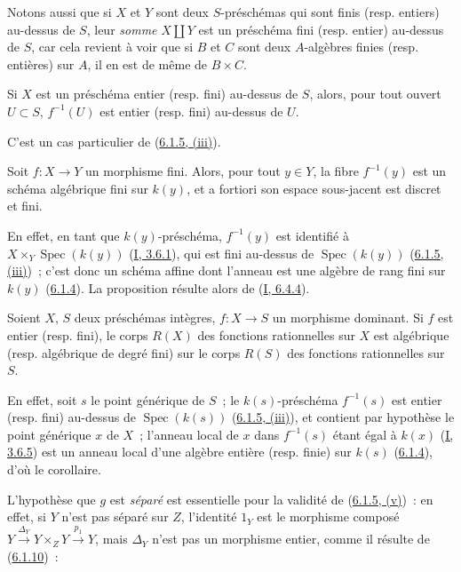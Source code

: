 Notons aussi que si $X$ et $Y$ sont deux $S$-préschémas qui sont finis (resp.
entiers) au-dessus de $S$, leur \emph{somme} $X\amalg Y$ est un préschéma fini
(resp. entier) au-dessus de $S$, car cela revient à voir que si $B$ et $C$
sont deux $A$-algèbres finies (resp. entières) sur $A$, il en est de même de
$B\times C$.

\begin{corollary}[6.1.6]
\label{II.6.1.6-fr}
Si $X$ est un préschéma entier (resp. fini) au-dessus de $S$, alors, pour tout
ouvert $U\subset S$, $f^{-1}(U)$ est entier (resp. fini) au-dessus de $U$.
\end{corollary}

C'est un cas particulier de (\hyperref[II.6.1.5-fr]{6.1.5, (iii)}).

\begin{corollary}[6.1.7]
\label{II.6.1.7-fr}
Soit $f:X\to Y$ un morphisme fini. Alors, pour tout $y\in Y$, la fibre
$f^{-1}(y)$ est un schéma algébrique fini sur $k(y)$, et a fortiori son
espace sous-jacent est discret et fini.
\end{corollary}

En effet, en tant que $k(y)$-préschéma, $f^{-1}(y)$ est identifié à
$X\times_Y\operatorname{Spec}(k(y))$ (\hyperref[I.3.6.1-fr]{I, 3.6.1}), qui
est fini au-dessus de $\operatorname{Spec}(k(y))$
(\hyperref[II.6.1.5-fr]{6.1.5, (iii)})~; c'est donc un schéma affine dont
l'anneau est une algèbre de rang fini sur $k(y)$
(\hyperref[II.6.1.4-fr]{6.1.4}). La proposition résulte alors de
(\hyperref[I.6.4.4-fr]{I, 6.4.4}).

\begin{corollary}[6.1.8]
\label{II.6.1.8-fr}
Soient $X$, $S$ deux préschémas intègres, $f:X\to S$ un morphisme dominant. Si
$f$ est entier (resp. fini), le corps $R(X)$ des fonctions rationnelles sur
$X$ est algébrique (resp. algébrique de degré fini) sur le corps $R(S)$ des
fonctions rationnelles sur $S$.
\end{corollary}

En effet, soit $s$ le point générique de $S$~; le $k(s)$-préschéma
$f^{-1}(s)$ est entier (resp. fini) au-dessus de
$\operatorname{Spec}(k(s))$ (\hyperref[II.6.1.5-fr]{6.1.5, (iii)}), et
contient par hypothèse le point générique $x$ de $X$~; l'anneau local de $x$
dans $f^{-1}(s)$ étant égal à $k(x)$ (\hyperref[I.3.6.5-fr]{I, 3.6.5}) est un
anneau local d'une algèbre entière (resp. finie) sur $k(s)$
(\hyperref[II.6.1.4-fr]{6.1.4}), d'où le corollaire.

\begin{remark}[6.1.9]
\label{II.6.1.9-fr}
L'hypothèse que $g$ est \emph{séparé} est essentielle pour la validité de
(\hyperref[II.6.1.5-fr]{6.1.5, (v)})~: en effet, si $Y$ n'est pas séparé sur
$Z$, l'identité $1_Y$ est le morphisme composé
$Y\xrightarrow{\Delta_Y}Y\times_ZY\xrightarrow{p_1}Y$, mais $\Delta_Y$ n'est
pas un morphisme entier, comme il résulte de
(\hyperref[II.6.1.10-fr]{6.1.10})~:
\end{remark}

